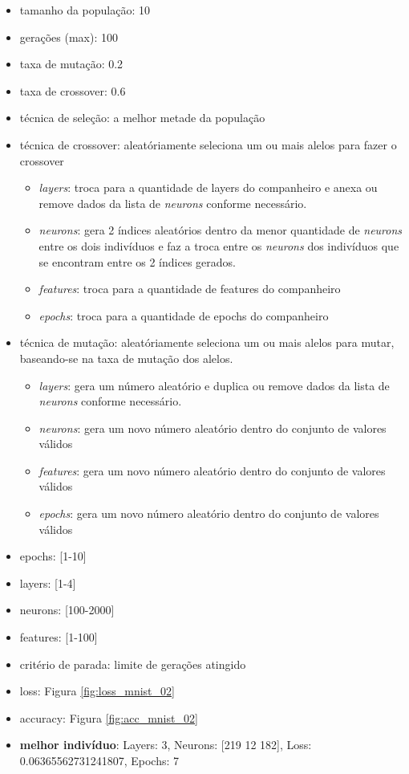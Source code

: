 \documentclass[twoside,conference,a4paper]{IEEEtran}
\begin{document}
\begin{itemize}
    \item tamanho da população: 10
    \item gerações (max): 100
    \item taxa de mutação: 0.2
    \item taxa de crossover: 0.6
    \item técnica de seleção: a melhor metade da população
    \item técnica de crossover: aleatóriamente seleciona um ou mais alelos para fazer o crossover
    \begin{itemize}
        \item \emph{layers}: troca para a quantidade de layers do companheiro e anexa ou remove dados da lista de \emph{neurons} conforme necessário.
        \item \emph{neurons}: gera 2 índices aleatórios dentro da menor quantidade de \emph{neurons} entre os dois indivíduos e faz a troca entre os \emph{neurons} dos indivíduos que se encontram entre os 2 índices gerados.
        \item \emph{features}: troca para a quantidade de features do companheiro
        \item \emph{epochs}: troca para a quantidade de epochs do companheiro
    \end{itemize}
    \item técnica de mutação: aleatóriamente seleciona um ou mais alelos para mutar, baseando-se na taxa de mutação dos alelos.
    \begin{itemize}
        \item \emph{layers}: gera um número aleatório e duplica ou remove dados da lista de \emph{neurons} conforme necessário.
        \item \emph{neurons}: gera um novo número aleatório dentro do conjunto de valores válidos
        \item \emph{features}: gera um novo número aleatório dentro do conjunto de valores válidos
        \item \emph{epochs}: gera um novo número aleatório dentro do conjunto de valores válidos
    \end{itemize}
    \item epochs: [1-10]
    \item layers: [1-4]
    \item neurons: [100-2000]
    \item features: [1-100]
    \item critério de parada: limite de gerações atingido
    \item loss: Figura \ref{fig:loss_mnist_02}
    \item accuracy: Figura \ref{fig:acc_mnist_02}
    \item \textbf{melhor indivíduo}: Layers: 3, Neurons: [219  12 182], Loss: 0.06365562731241807, Epochs: 7
\end{itemize}
\end{document}
